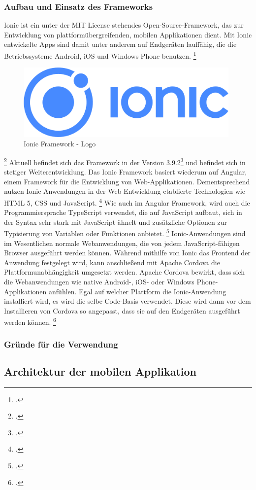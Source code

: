 \subsubsection{Aufbau und Einsatz des Frameworks}
Ionic ist ein unter der MIT License stehendes Open-Source-Framework, das zur Entwicklung von plattformübergreifenden, mobilen Applikationen dient. Mit Ionic entwickelte Apps sind damit unter anderem auf Endgeräten lauffähig, die die Betriebssysteme Android, iOS und Windows Phone benutzen. \footcite{Ion18a}
\begin{figure}[h]
	\centering
	\includegraphics[width=11cm]{Bilder/ionic.png}
	\caption[Ionic Framework - Logo]{Ionic Framework - Logo\footnotemark}
\end{figure}%
\footcitetext{Wik18}
\newline
Aktuell befindet sich das Framework in der Version 3.9.2\footcite[Vgl. ][]{Ion18b} und befindet sich in stetiger Weiterentwicklung. Das Ionic Framework basiert wiederum auf Angular, einem Framework für die Entwicklung von Web-Applikationen. Dementsprechend nutzen Ionic-Anwendungen in der Web-Entwicklung etablierte Technologien wie HTML 5, CSS und JavaScript. \footcite[Vgl. ][]{Ion18c} Wie auch im Angular Framework, wird auch die Programmiersprache TypeScript verwendet, die auf JavaScript aufbaut, sich in der Syntax sehr stark mit JavaScript ähnelt und zusätzliche Optionen zur Typisierung von Variablen oder Funktionen anbietet. \footcite[Vgl. ][]{Til17} \newline
Ionic-Anwendungen sind im Wesentlichen normale Webanwendungen, die von jedem JavaScript-fähigen Browser ausgeführt werden können. Während mithilfe von Ionic das Frontend der Anwendung festgelegt wird, kann anschließend mit Apache Cordova die Plattformunabhängigkeit umgesetzt werden. Apache Cordova bewirkt, dass sich die Webanwendungen wie native Android-, iOS- oder Windows Phone-Applikationen anfühlen. Egal auf welcher Plattform die Ionic-Anwendung installiert wird, es wird die selbe Code-Basis verwendet. Diese wird dann vor dem Installieren von Cordova so angepasst, dass sie auf den Endgeräten ausgeführt werden können. \footcite{Ion18d}
\subsubsection{Gründe für die Verwendung}

\subsection{Architektur der mobilen Applikation}

